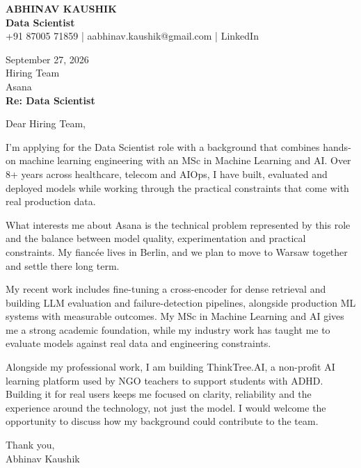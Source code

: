 \documentclass[10pt,a4paper]{article}
\begin{document}
\begin{center}
{\Large\bfseries ABHINAV KAUSHIK}\\[2pt]
{\bfseries Data Scientist}\\[2pt]
+91 87005 71859 \quad | \quad aabhinav.kaushik@gmail.com \quad | \quad LinkedIn
\end{center}
\vspace{8pt}
September 27, 2026\\[6pt]
Hiring Team\\
Asana\\[4pt]
\textbf{Re: Data Scientist}

Dear Hiring Team,

I’m applying for the Data Scientist role with a background that combines hands-on machine learning engineering with an MSc in Machine Learning and AI. Over 8+ years across healthcare, telecom and AIOps, I have built, evaluated and deployed models while working through the practical constraints that come with real production data.

What interests me about Asana is the technical problem represented by this role and the balance between model quality, experimentation and practical constraints. My fiancée lives in Berlin, and we plan to move to Warsaw together and settle there long term.

My recent work includes fine-tuning a cross-encoder for dense retrieval and building LLM evaluation and failure-detection pipelines, alongside production ML systems with measurable outcomes. My MSc in Machine Learning and AI gives me a strong academic foundation, while my industry work has taught me to evaluate models against real data and engineering constraints.

Alongside my professional work, I am building ThinkTree.AI, a non-profit AI learning platform used by NGO teachers to support students with ADHD. Building it for real users keeps me focused on clarity, reliability and the experience around the technology, not just the model. I would welcome the opportunity to discuss how my background could contribute to the team.

Thank you,\\
Abhinav Kaushik
\end{document}
